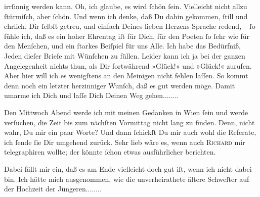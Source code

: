                irrſinnig werden kann. Oh, ich glaube, es wird ſchön ſein. Vielleicht nicht allzu
               ſtürmiſch, aber ſchön. Und wenn ich denke, {\pb}daß Du
               dahin gekommen, ſtill und ehrlich, Dir  ſelbſt
               getreu, und einfach Deines lieben Herzens Sprache redend, – ſo fühle ich, daß es ein
               hoher Ehrentag iſt für Dich, für den Poeten ſo ſehr
               wie für den Menſchen, und ein ſtarkes Beiſpiel für uns Alle. Ich habe das Bedürfniß,
               Jeden dieſer Briefe mit Wünſchen zu füllen. Leider kann ich ja bei der ganzen
               Angelegenheit nichts thun, als Dir fortwährend »Glück!« und »Glück!« zurufen. Aber
               hier will ich es wenigſtens an den Meinigen nicht {\pb}fehlen laſſen. So kommt denn noch ein letzter herzinniger Wunſch, daß es gut werden
               möge. Damit umarme ich Dich und laſſe Dich Deinen Weg gehen........\pend
           
\pstart
           Den Mittwoch{ }Abend werde ich mit meinen Gedanken in Wien ſein und werde verſuchen, die Zeit bis zum nächſten
                  Vormittag nicht lang zu finden. Denn, nicht wahr, Du \label{K_L02750-2v}\label{K_L02750-2} mir ein paar Worte? Und dann ſchickſt Du mir auch wohl die
               Referate, ich ſende {\pb}ſie Dir umgehend zurück. Sehr
               lieb wäre es, wenn auch \textsc{Richard} mir telegraphiren wollte; der könnte ſchon etwas ausführlicher berichten.\pend
           
\pstart
           Dabei fällt mir ein, daß es am Ende vielleicht doch gut iſt, wenn ich nicht dabei
               bin. Ich hätte mich ausgenommen, wie die unverheirathete ältere Schweſter auf der
               Hochzeit der Jüngeren........\pend
           
